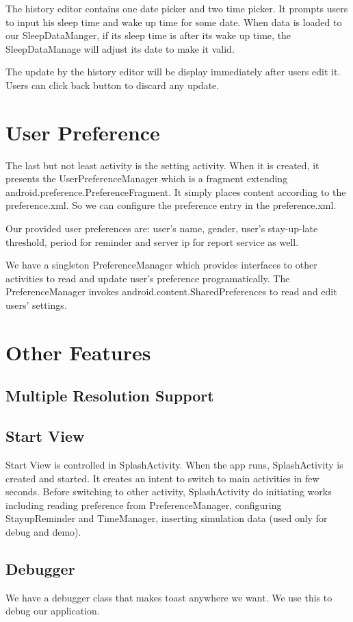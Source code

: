 \documentclass[14pt]{extreport}
\begin{document}
The history editor contains one date picker and two time picker. It prompts users to input his sleep time and wake up time for some date. When data is loaded to our SleepDataManger, if its sleep time is after its wake up time, the SleepDataManage will adjust its date to make it valid.

The update by the history editor will be display immediately after users edit it. Users can click back button to discard any update.

\chapter{User Preference}
The last but not least activity is the setting activity. When it is created, it presents the UserPreferenceManager which is a fragment extending android.preference.PreferenceFragment. It simply places content according to the preference.xml. So we can configure the preference entry in the preference.xml.

Our provided user preferences are: user's name, gender, user's stay-up-late threshold, period for reminder and server ip for report service as well.

We have a singleton PreferenceManager which provides interfaces to other activities to read and update user's preference programatically. The PreferenceManager invokes android.content.SharedPreferences to read and edit users' settings.

\chapter{Other Features}
\section{Multiple Resolution Support}

\section{Start View}
Start View is controlled in SplashActivity. When the app runs, SplashActivity is created and started. It creates an intent to switch to main activities in few seconds. Before switching to other activity, SplashActivity do initiating works including reading preference from PreferenceManager, configuring StayupReminder and TimeManager, inserting simulation data (used only for debug and demo). 

\section{Debugger}
We have a debugger class that makes toast anywhere we want. We use this to debug our application.
\end{document}
